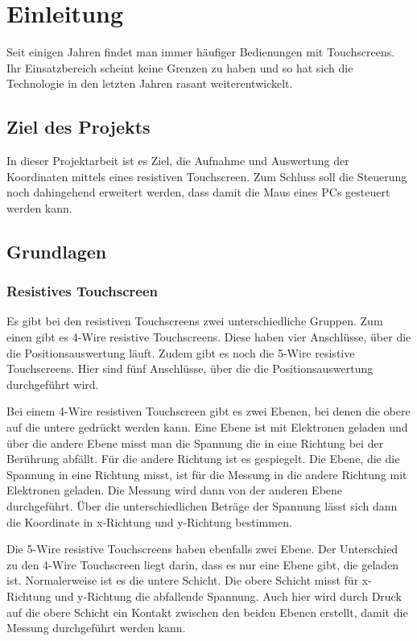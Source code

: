 \chapter{Einleitung}
Seit einigen Jahren findet man immer häufiger Bedienungen mit Touchscreens.
Ihr Einsatzbereich scheint keine Grenzen zu haben und so hat sich die Technologie in den letzten Jahren rasant weiterentwickelt.


\section{Ziel des Projekts}
In dieser Projektarbeit ist es Ziel, die Aufnahme und Auswertung der Koordinaten mittels eines resistiven Touchscreen.
Zum Schluss soll die Steuerung noch dahingehend erweitert werden, dass damit die Maus eines PCs gesteuert werden kann.


\section{Grundlagen}
\subsection{Resistives Touchscreen}
Es gibt bei den resistiven Touchscreens zwei unterschiedliche Gruppen.
Zum einen gibt es 4-Wire resistive Touchscreens.
Diese haben vier Anschlüsse, über die die Positionsauswertung läuft.
Zudem gibt es noch die 5-Wire resistive Touchscreens.
Hier sind fünf Anschlüsse, über die die Positionsauswertung durchgeführt wird.

Bei einem 4-Wire resistiven Touchscreen gibt es zwei Ebenen, bei denen die obere auf die untere gedrückt werden kann.
Eine Ebene ist mit Elektronen geladen und über die andere Ebene misst man die Spannung die in eine Richtung bei der Berührung abfällt.
Für die andere Richtung ist es gespiegelt.
Die Ebene, die die Spannung in eine Richtung misst, ist für die Messung in die andere Richtung mit Elektronen geladen.
Die Messung wird dann von der anderen Ebene durchgeführt.
Über die unterschiedlichen Beträge der Spannung lässt sich dann die Koordinate in x-Richtung und y-Richtung bestimmen.

Die 5-Wire resistive Touchscreens haben ebenfalls zwei Ebene.
Der Unterschied zu den 4-Wire Touchscreen liegt darin, dass es nur eine Ebene gibt, die geladen ist.
Normalerweise ist es die untere Schicht.
Die obere Schicht misst  für x-Richtung und y-Richtung die abfallende Spannung.
Auch hier wird durch Druck auf die obere Schicht ein Kontakt zwischen den beiden Ebenen erstellt, damit die Messung durchgeführt werden kann.


